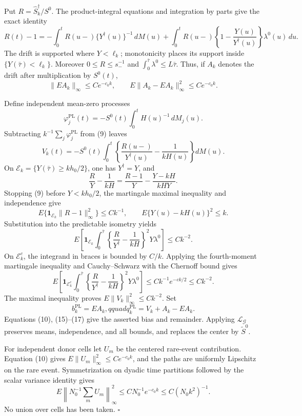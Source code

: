 Put \(R=\widehat S_k^\dagger/S^0\). The product-integral equations and integration by parts give the exact identity
\[
 R(t)-1=-\int_0^tR(u-)\{Y^\dagger(u)\}^{-1}\,dM(u)
 +\int_0^tR(u-)\left\{1-\frac{Y(u)}{Y^\dagger(u)}\right\}
          \lambda^0(u)\,du.                               \tag{9}
\]
The drift is supported where \(Y<\ell_k\); monotonicity places its support inside \(\{Y(\bar\tau)<\ell_k\}\). Moreover \(0\le R\le s_-^{-1}\) and \(\int_0^{\bar\tau}\lambda^0\le L\bar\tau\). Thus, if \(A_k\) denotes the drift after multiplication by \(S^0(t)\),
\[
 \|EA_k\|_\infty\le Ce^{-c_0k},
 \qquad E\|A_k-EA_k\|_\infty^2\le Ce^{-c_0k}.             \tag{10}
\]

Define independent mean-zero processes
\[
 \varphi_j^{\mathrm{PL}}(t)
 =-S^0(t)\int_0^tH(u)^{-1}\,dM_j(u).                      \tag{11}
\]
Subtracting \(k^{-1}\sum_j\varphi_j^{\mathrm{PL}}\) from (9) leaves
\[
 V_k(t)=-S^0(t)\int_0^t
 \left\{\frac{R(u-)}{Y^\dagger(u)}-\frac1{kH(u)}\right\}
 dM(u).                                                     \tag{12}
\]
On \(\mathcal E_k=\{Y(\bar\tau)\ge kh_0/2\}\), one has \(Y^\dagger=Y\), and
\[
 \frac{R}{Y}-\frac1{kH}
 =\frac{R-1}{Y}-\frac{Y-kH}{kHY}.                          \tag{13}
\]
Stopping (9) before \(Y<kh_0/2\), the martingale maximal inequality and independence give
\[
 E\{\mathbf1_{\mathcal E_k}\|R-1\|_\infty^2\}\le Ck^{-1},
 \qquad E\{Y(u)-kH(u)\}^2\le k.                           \tag{14}
\]
Substitution into the predictable isometry yields
\[
 E\left[\mathbf1_{\mathcal E_k}\int_0^{\bar\tau}
 \left\{\frac{R}{Y^\dagger}-\frac1{kH}\right\}^2
 Y\lambda^0\right]\le Ck^{-2}.                           \tag{15}
\]
On \(\mathcal E_k^c\), the integrand in braces is bounded by \(C/k\). Applying the fourth-moment martingale inequality and Cauchy--Schwarz with the Chernoff bound gives
\[
 E\left[\mathbf1_{\mathcal E_k^c}\int_0^{\bar\tau}
 \left\{\frac{R}{Y^\dagger}-\frac1{kH}\right\}^2
 Y\lambda^0\right]
 \le Ck^{-1}e^{-ck/2}\le Ck^{-2}.                         \tag{16}
\]
The maximal inequality proves \(E\|V_k\|_\infty^2\le Ck^{-2}\). Set
\[
 b_k^{\mathrm{PL}}=EA_k,qquad q_k^{\mathrm{PL}}=V_k+A_k-EA_k. \tag{17}
\]
Equations (10), (15)--(17) give the asserted bias and remainder. Applying \(\mathcal L_{\mathcal G}\) preserves means, independence, and all bounds, and replaces the center by \(\widetilde S^0\).

For independent donor cells let \(U_m\) be the centered rare-event contribution. Equation (10) gives \(E\|U_m\|_\infty^2\le Ce^{-c_0k}\), and the paths are uniformly Lipschitz on the rare event. Symmetrization on dyadic time partitions followed by the scalar variance identity gives
\[
 E\left\|N_0^{-1}\sum_mU_m\right\|_\infty^2
 \le C N_0^{-1}e^{-c_0k}\le C(N_0k^2)^{-1}.               \tag{18}
\]
No union over cells has been taken. \(\square\)